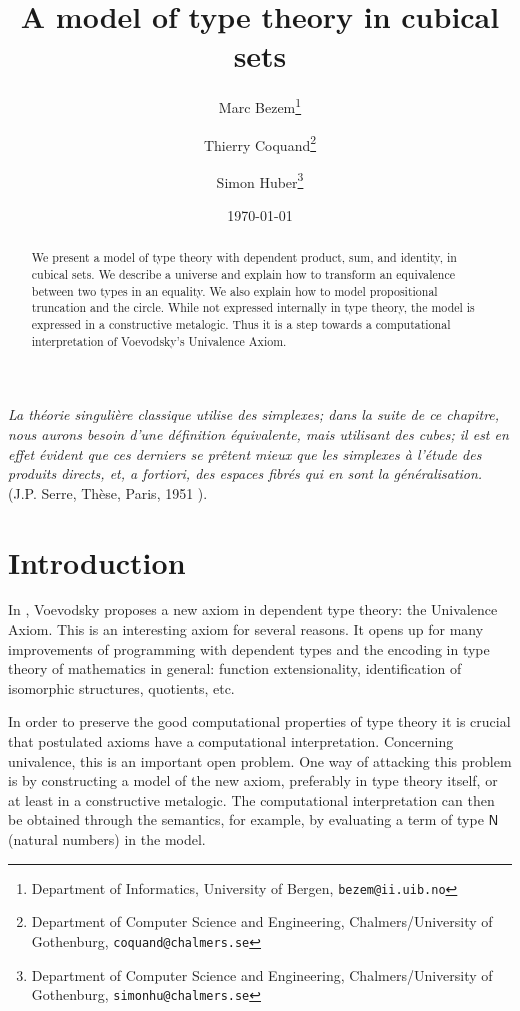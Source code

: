 \documentclass[10pt,a4paper]{article}
\newcommand{\nat}{\mathsf{N}}
\begin{document}
\title{A model of type theory in cubical sets}

\author{
Marc Bezem\thanks{Department of Informatics, University of Bergen, {\tt bezem@ii.uib.no}}
\and
Thierry Coquand\thanks{Department of Computer Science and Engineering, Chalmers/University of Gothenburg, {\tt coquand@chalmers.se}}
\and
Simon Huber\thanks{Department of Computer Science and Engineering, Chalmers/University of Gothenburg, {\tt simonhu@chalmers.se}}
}
\date{\today}
\maketitle


{\em La th\'eorie singuli\`ere classique utilise des {\em simplexes}; dans la suite de ce chapitre,
nous aurons besoin d'une d\'efinition
\'equivalente, mais utilisant des {\em cubes}; il est en effet \'evident que ces derniers se pr\^etent mieux que les
simplexes \`a l'\'etude des produits directs, et, a fortiori, des espaces fibr\'es qui en sont la g\'en\'eralisation.}
(J.P. Serre, Th\`ese, Paris, 1951 \cite{Serre}).


\begin{abstract}\noindent
  We present a model of type theory with dependent product, sum, and
  identity, in cubical sets.  We describe a universe and explain how
  to transform an equivalence between two types in an equality.  We
  also explain how to model propositional truncation and the circle.
  While not expressed internally in type theory, the model is
  expressed in a constructive metalogic.  Thus it is a step towards a
  computational interpretation of Voevodsky's Univalence Axiom.
\end{abstract}

\section*{Introduction}

In \cite{Voevodsky}, Voevodsky proposes a new axiom in dependent type
theory: the Univalence Axiom. This is an interesting axiom for several
reasons.  It opens up for many improvements of programming with
dependent types and the encoding in type theory of mathematics in
general: function extensionality, identification of isomorphic
structures, quotients, etc.

In order to preserve the good computational properties of type theory
it is crucial that postulated axioms have a computational
interpretation.  Concerning univalence, this is an important open
problem.  One way of attacking this problem is by constructing a model
of the new axiom, preferably in type theory itself, or at least in a
constructive metalogic.  The computational interpretation can then be
obtained through the semantics, for example, by evaluating a term of
type $\nat$ (natural numbers) in the model.
\end{document}

